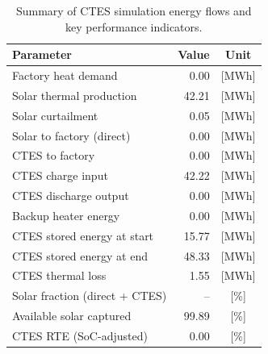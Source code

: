 \renewcommand{\arraystretch}{1.2}
\begin{table}[h]
\centering
\begin{tabular}{l|r c}
\hline
Parameter & Value & Unit \\
\hline
Factory heat demand & 0.00 & [MWh] \\
Solar thermal production & 42.21 & [MWh] \\
Solar curtailment & 0.05 & [MWh] \\
Solar to factory (direct) & 0.00 & [MWh] \\
CTES to factory & 0.00 & [MWh] \\
CTES charge input & 42.22 & [MWh] \\
CTES discharge output & 0.00 & [MWh] \\
Backup heater energy & 0.00 & [MWh] \\
CTES stored energy at start & 15.77 & [MWh] \\
CTES stored energy at end & 48.33 & [MWh] \\
CTES thermal loss & 1.55 & [MWh] \\
\hline
Solar fraction (direct + CTES) & -- & [\%] \\
Available solar captured & 99.89 & [\%] \\
CTES RTE (SoC-adjusted) & 0.00 & [\%] \\
\hline
\end{tabular}
\caption{Summary of CTES simulation energy flows and key performance indicators.}
\label{tab:ctes-simulation-summary}
\end{table}
